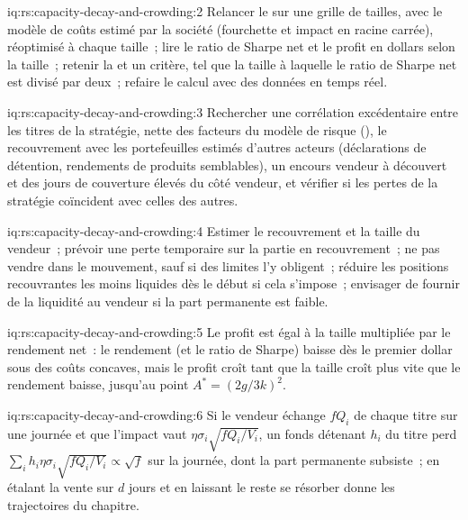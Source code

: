 \begin{solution}{iq:rs:capacity-decay-and-crowding:2}
Relancer le  sur une grille de tailles, avec le modèle de coûts estimé par la société (fourchette et impact en racine carrée), réoptimisé à chaque taille~; lire le ratio de Sharpe net et
le profit en dollars selon la taille~; retenir la  et un critère, tel que la taille à laquelle le ratio de Sharpe net est divisé par deux~; refaire le calcul avec des données en temps réel.
\end{solution}

\begin{solution}{iq:rs:capacity-decay-and-crowding:3}
Rechercher une corrélation excédentaire entre les titres de la stratégie, nette des facteurs du modèle de risque (), le recouvrement avec les portefeuilles estimés d'autres acteurs (déclarations de détention, rendements
de produits semblables), un encours vendeur à découvert et des jours de couverture élevés du côté vendeur, et vérifier si les pertes de la stratégie coïncident avec celles des autres.
\end{solution}

\begin{solution}{iq:rs:capacity-decay-and-crowding:4}
Estimer le recouvrement et la taille du vendeur~; prévoir une perte temporaire sur la partie en recouvrement~; ne pas vendre dans le mouvement, sauf si des limites l'y obligent~; réduire
les positions recouvrantes les moins liquides dès le début si cela s'impose~; envisager de fournir de la liquidité au vendeur si la part permanente est faible.
\end{solution}

\begin{solution}{iq:rs:capacity-decay-and-crowding:5}
Le profit est égal à la taille multipliée par le rendement net~: le rendement (et le ratio de Sharpe) baisse dès le premier dollar sous des coûts concaves, mais le profit croît tant que la taille croît plus vite
que le rendement baisse, jusqu'au point $A^* = (2g/3k)^2$.
\end{solution}

\begin{solution}{iq:rs:capacity-decay-and-crowding:6}
Si le vendeur échange $fQ_i$ de chaque titre sur une journée et que l'impact vaut $\eta\sigma_i\sqrt{fQ_i/V_i}$, un fonds détenant $h_i$ du titre perd
$\sum_i h_i\eta\sigma_i\sqrt{fQ_i/V_i} \propto \sqrt f$ sur la journée, dont la part permanente subsiste~; en étalant la vente sur $d$ jours et en laissant le reste se résorber
donne les trajectoires du chapitre.
\end{solution}
